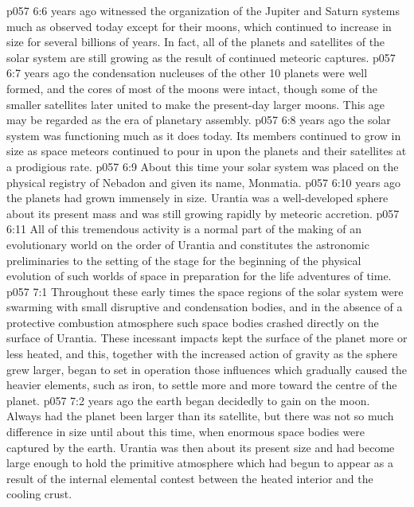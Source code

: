 \vs p057 6:6 \pc {} years ago witnessed the organization of the Jupiter and Saturn systems much as observed today except for their moons, which continued to increase in size for several billions of years. In fact, all of the planets and satellites of the solar system are still growing as the result of continued meteoric captures.
\vs p057 6:7 \pc {} years ago the condensation nucleuses of the other 10 planets were well formed, and the cores of most of the moons were intact, though some of the smaller satellites later united to make the present\hyp{}day larger moons. This age may be regarded as the era of planetary assembly.
\vs p057 6:8 \pc {} years ago the solar system was functioning much as it does today. Its members continued to grow in size as space meteors continued to pour in upon the planets and their satellites at a prodigious rate.
\vs p057 6:9 About this time your solar system was placed on the physical registry of Nebadon and given its name, Monmatia.
\vs p057 6:10 \pc {} years ago the planets had grown immensely in size. Urantia was a well\hyp{}developed sphere about  its present mass and was still growing rapidly by meteoric accretion.
\vs p057 6:11 All of this tremendous activity is a normal part of the making of an evolutionary world on the order of Urantia and constitutes the astronomic preliminaries to the setting of the stage for the beginning of the physical evolution of such worlds of space in preparation for the life adventures of time.
\vs p057 7:1 Throughout these early times the space regions of the solar system were swarming with small disruptive and condensation bodies, and in the absence of a protective combustion atmosphere such space bodies crashed directly on the surface of Urantia. These incessant impacts kept the surface of the planet more or less heated, and this, together with the increased action of gravity as the sphere grew larger, began to set in operation those influences which gradually caused the heavier elements, such as iron, to settle more and more toward the centre of the planet.
\vs p057 7:2 \pc {} years ago the earth began decidedly to gain on the moon. Always had the planet been larger than its satellite, but there was not so much difference in size until about this time, when enormous space bodies were captured by the earth. Urantia was then about  its present size and had become large enough to hold the primitive atmosphere which had begun to appear as a result of the internal elemental contest between the heated interior and the cooling crust.
